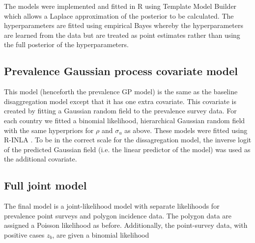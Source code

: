 \documentclass{statsoc}
\begin{document}
The models were implemented and fitted in R \citep{R} using Template Model Builder \citep{TMB} which allows a Laplace approximation of the posterior to be calculated.
The hyperparameters are fitted using empirical Bayes whereby the hyperparameters are learned from the data but are treated as point estimates rather than using the full posterior of the hyperparameters.

%
%
%
%
%
%
%

\subsection*{Prevalence Gaussian process covariate model}

This model (henceforth the prevalence GP model) is the same as the baseline disaggregation model except that it has one extra covariate.
This covariate is created by fitting a Gaussian random field to the prevalence survey data.
For each country we fitted a binomial likelihood, hierarchical Gaussian random field with the same hyperpriors for $\rho$ and $\sigma_u$ as above.
These models were fitted using R-INLA \citep{INLA}.
To be in the correct scale for the dissagregation model, the inverse logit of the predicted Gaussian field (i.e. the linear predictor of the model) was used as the additional covariate.

\subsection*{Full joint model}

The final model is a joint-likelihood model with separate likelihoods for prevalence point surveys and polygon incidence data.
The polygon data are assigned a Poisson likelihood as before.
Additionally, the point-survey data, with positive cases $z_b$, are given a binomial likelihood
\end{document}
